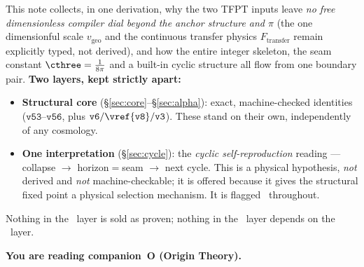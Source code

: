 
\maketitle
\vspace{-0.7cm}

\begin{keybox}
This note collects, in one derivation, why the two TFPT inputs leave \emph{no free dimensionless
compiler dial beyond the anchor structure and $\pi$} (the one dimensionful scale $v_{\mathrm{geo}}$ and
the continuous transfer physics $F_{\mathrm{transfer}}$ remain explicitly typed, not derived), and how
the entire integer skeleton, the seam constant $\cthree=\tfrac1{8\pi}$ and a built-in cyclic
structure all flow from one boundary pair. \textbf{Two layers, kept strictly apart:}
\begin{itemize}[leftmargin=1.3em]
\item \textbf{Structural core \mE} (\S\ref{sec:core}--\S\ref{sec:alpha}): exact, machine-checked
identities ($\mathtt{v53}$--$\mathtt{v56}$, plus $\mathtt{v6/\vref{v8}/v3}$). These stand on their own,
independently of any cosmology.
\item \textbf{One interpretation \mC} (\S\ref{sec:cycle}): the \emph{cyclic self-reproduction} reading
--- collapse $\to$ horizon$=$seam $\to$ next cycle. This is a physical hypothesis, \emph{not} derived and
\emph{not} machine-checkable; it is offered because it gives the structural fixed point a physical
selection mechanism. It is flagged \mC\ throughout.
\end{itemize}
Nothing in the \mC\ layer is sold as proven; nothing in the \mE\ layer depends on the \mC\ layer.
\end{keybox}
\markerkey

\tableofcontents


\noindent\textbf{You are reading \textbf{companion~O} (Origin Theory).}


\TFPTbadges
\TFPTclaimstack[anchor]

\bigskip

